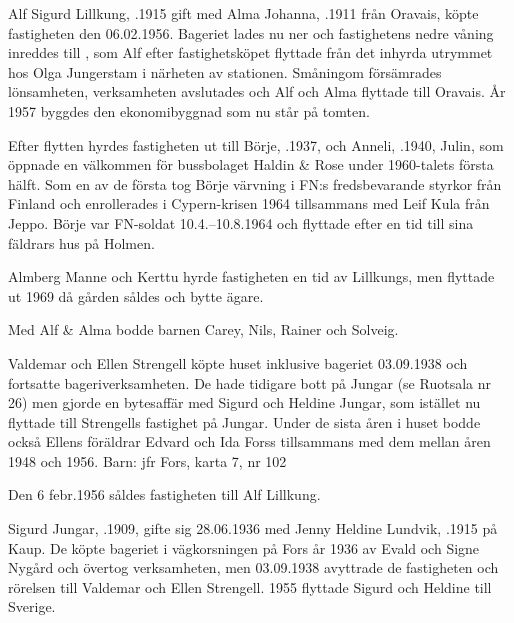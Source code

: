 Alf Sigurd Lillkung, .1915 gift med Alma Johanna, .1911 från Oravais, köpte fastigheten den 06.02.1956. Bageriet lades nu ner och fastighetens nedre våning inreddes till , som Alf efter fastighetsköpet flyttade från det inhyrda utrymmet hos Olga Jungerstam i närheten av stationen. Småningom försämrades lönsamheten, verksamheten avslutades och Alf och Alma flyttade till Oravais. År 1957 byggdes den ekonomibyggnad som nu står på tomten.

Efter flytten hyrdes fastigheten ut till Börje, .1937, och Anneli, .1940, Julin, som öppnade en välkommen  för bussbolaget Haldin \& Rose under 1960-talets första hälft. Som en av de första tog Börje värvning i FN:s fredsbevarande styrkor från Finland och enrollerades i Cypern-krisen 1964 tillsammans med Leif Kula från Jeppo. Börje var FN-soldat 10.4.--10.8.1964 och flyttade efter en tid till sina fäldrars hus på Holmen.

Almberg Manne och Kerttu hyrde fastigheten en tid av Lillkungs, men flyttade ut 1969 då gården såldes och bytte ägare.

Med Alf \& Alma bodde barnen Carey, Nils, Rainer och Solveig.


Valdemar och Ellen Strengell köpte huset inklusive bageriet 03.09.1938 och fortsatte bageriverksamheten. De hade tidigare bott på Jungar (se Ruotsala nr 26) men gjorde en bytesaffär med Sigurd och Heldine Jungar, som istället nu flyttade till Strengells fastighet på Jungar. Under de sista åren i huset bodde också Ellens föräldrar Edvard och Ida Forss tillsammans med dem mellan åren 1948 och 1956.
Barn: jfr Fors, karta 7, nr 102

Den 6 febr.1956 såldes fastigheten till Alf Lillkung.


Sigurd Jungar, .1909, gifte sig 28.06.1936 med Jenny Heldine Lundvik, .1915 på Kaup. De köpte bageriet i vägkorsningen på Fors år 1936 av Evald och Signe Nygård och övertog verksamheten, men 03.09.1938 avyttrade de fastigheten och rörelsen till Valdemar och Ellen Strengell. 1955 flyttade Sigurd och Heldine till Sverige.
\begin{jhchildren}
  \item {}
  \item {}
  \item {}
\end{jhchildren}


